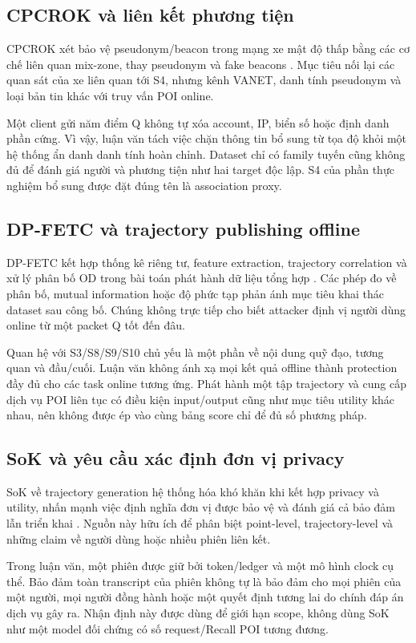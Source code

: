 \subsection{CPCROK và liên kết phương tiện}
CPCROK xét bảo vệ pseudonym/beacon trong mạng xe mật độ thấp bằng các cơ chế liên quan mix-zone,
thay pseudonym và fake beacons \cite{cpcrok}. Mục tiêu nối lại các quan sát của xe liên quan tới S4,
nhưng kênh VANET, danh tính pseudonym và loại bản tin khác với truy vấn POI online.

Một client gửi năm điểm Q không tự xóa account, IP, biển số hoặc định danh phần cứng. Vì vậy, luận
văn tách việc chặn thông tin bổ sung từ tọa độ khỏi một hệ thống ẩn danh danh tính hoàn chỉnh.
Dataset chỉ có family tuyến cũng không đủ để đánh giá người và phương tiện như hai target độc lập.
S4 của phần thực nghiệm bổ sung được đặt đúng tên là association proxy.

\subsection{DP-FETC và trajectory publishing offline}
DP-FETC kết hợp thống kê riêng tư, feature extraction, trajectory correlation và xử lý phân bố OD
trong bài toán phát hành dữ liệu tổng hợp \cite{dpfetc}. Các phép đo về phân bố, mutual information
hoặc độ phức tạp phản ánh mục tiêu khai thác dataset sau công bố. Chúng không trực tiếp cho biết
attacker định vị người dùng online từ một packet Q tốt đến đâu.

Quan hệ với S3/S8/S9/S10 chủ yếu là một phần về nội dung quỹ đạo, tương quan và đầu/cuối. Luận văn
không ánh xạ mọi kết quả offline thành protection đầy đủ cho các task online tương ứng. Phát hành
một tập trajectory và cung cấp dịch vụ POI liên tục có điều kiện input/output cũng như mục tiêu
utility khác nhau, nên không được ép vào cùng bảng score chỉ để đủ số phương pháp.

\subsection{SoK và yêu cầu xác định đơn vị privacy}
SoK về trajectory generation hệ thống hóa khó khăn khi kết hợp privacy và utility, nhấn mạnh việc
định nghĩa đơn vị được bảo vệ và đánh giá cả bảo đảm lẫn triển khai \cite{sok}. Nguồn này hữu ích để
phân biệt point-level, trajectory-level và những claim về người dùng hoặc nhiều phiên liên kết.

Trong luận văn, một phiên được giữ bởi token/ledger và một mô hình clock cụ thể. Bảo đảm toàn
transcript của phiên không tự là bảo đảm cho mọi phiên của một người, mọi người đồng hành hoặc
một quyết định tương lai do chính đáp án dịch vụ gây ra. Nhận định này được dùng để giới hạn scope,
không dùng SoK như một model đối chứng có số request/Recall POI tương đương.

